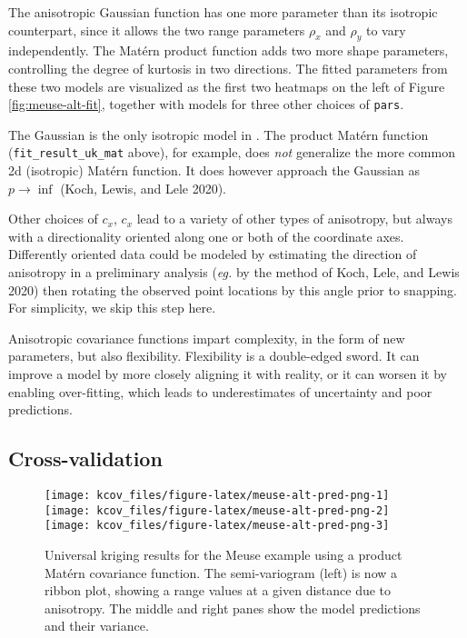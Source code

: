The anisotropic Gaussian function has one more parameter than its isotropic counterpart, since it allows the two range parameters \(\rho_x\) and \(\rho_y\) to vary independently. The Matérn product function adds two more shape parameters, controlling the degree of kurtosis in two directions. The fitted parameters from these two models are visualized as the first two heatmaps on the left of Figure \ref{fig:meuse-alt-fit}, together with models for three other choices of \texttt{pars}.

The Gaussian is the only isotropic model in . The product Matérn function (\texttt{fit\_result\_uk\_mat} above), for example, does \emph{not} generalize the more common 2d (isotropic) Matérn function. It does however approach the Gaussian as \(p \to \inf\) (Koch, Lewis, and Lele 2020).

Other choices of \(c_x\), \(c_x\) lead to a variety of other types of anisotropy, but always with a directionality oriented along one or both of the coordinate axes. Differently oriented data could be modeled by estimating the direction of anisotropy in a preliminary analysis (\emph{eg.} by the method of Koch, Lele, and Lewis 2020) then rotating the observed point locations by this angle prior to snapping. For simplicity, we skip this step here.

Anisotropic covariance functions impart complexity, in the form of new parameters, but also flexibility. Flexibility is a double-edged sword. It can improve a model by more closely aligning it with reality, or it can worsen it by enabling over-fitting, which leads to underestimates of uncertainty and poor predictions.

\hypertarget{cross-validation}{%
\subsection{Cross-validation}\label{cross-validation}}

\begin{figure}[!bht]
\texttt{[image: kcov\_files/figure-latex/meuse-alt-pred-png-1]} \texttt{[image: kcov\_files/figure-latex/meuse-alt-pred-png-2]} \texttt{[image: kcov\_files/figure-latex/meuse-alt-pred-png-3]} \caption{Universal kriging results for the Meuse example using a product Matérn covariance function. The semi-variogram (left) is now a ribbon plot, showing a range values at a given distance due to anisotropy. The middle and right panes show the model predictions and their variance.}\label{fig:meuse-alt-pred-png}
\end{figure}

